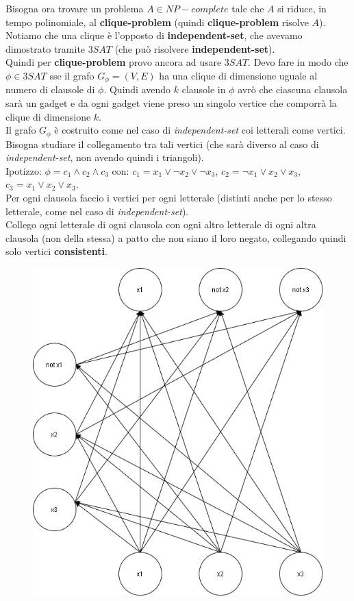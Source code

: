 Bisogna ora trovare un problema $A\in {NP-complete}$ tale che $A$ si riduce, in tempo polinomiale, al \textbf{clique-problem} (quindi \textbf{clique-problem} risolve $A$). \\ 
Notiamo che una clique è l'opposto di \textbf{independent-set}, che avevamo dimostrato tramite $3SAT$ (che può risolvere \textbf{independent-set}).\\ 
Quindi per \textbf{clique-problem} provo ancora ad usare $3SAT$. Devo fare in modo che $\phi\in 3SAT$ sse il grafo $G_\phi =(V,E)$ ha una clique di dimensione uguale al numero di clausole di $\phi$. Quindi avendo $k$ clausole in $\phi$ avrò che ciascuna clausola sarà un gadget e da ogni gadget viene preso un singolo vertice che comporrà la clique di dimensione $k$.\\    
Il grafo $G_\phi$ è costruito come nel caso di \textit{independent-set} coi letterali come vertici.\\ Bisogna studiare il collegamento tra tali vertici (che sarà diverso al caso di \textit{independent-set}, non avendo quindi i triangoli).\\

Ipotizzo: 
$\phi=c_1\land c_2\land c_3$ con: $c_1=x_1\lor \neg x_2\lor \neg x_3$, $c_2=\neg x_1\lor x_2\lor x_3$, $c_3=x_1\lor x_2\lor x_3$. \\ 
Per ogni clausola faccio i vertici per ogni letterale (distinti anche per lo stesso letterale, come nel caso di \textit{independent-set}).\\ 
Collego ogni letterale di ogni clausola con ogni altro letterale di ogni altra clausola (non della stessa) a patto che non siano il loro negato, collegando quindi solo vertici \textbf{consistenti}.
\begin{figure}[H]
    \centering
    \includegraphics[scale = 0.3]{imm/grafico.png}
\end{figure}

